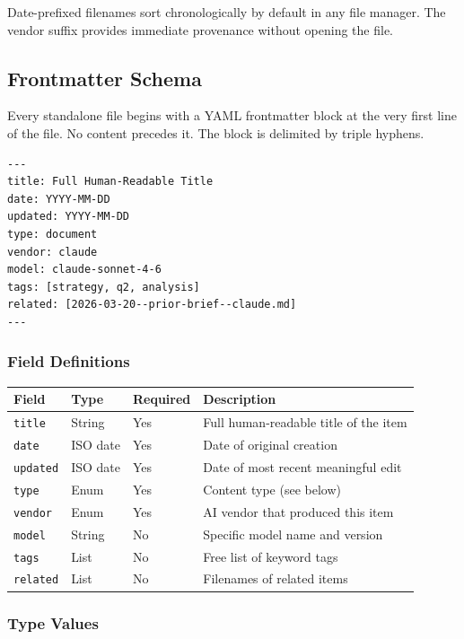 \documentclass[12pt,letterpaper]{article}
\begin{document}
Date-prefixed filenames sort chronologically by default in any file manager.
The vendor suffix provides immediate provenance without opening the file.

\subsection{Frontmatter Schema}

Every standalone file begins with a YAML frontmatter block at the very first
line of the file. No content precedes it. The block is delimited by triple
hyphens.

\begin{lstlisting}
---
title: Full Human-Readable Title
date: YYYY-MM-DD
updated: YYYY-MM-DD
type: document
vendor: claude
model: claude-sonnet-4-6
tags: [strategy, q2, analysis]
related: [2026-03-20--prior-brief--claude.md]
---
\end{lstlisting}

\subsubsection{Field Definitions}

\begin{longtable}{@{}lllp{5.5cm}@{}}
\toprule
\textbf{Field} & \textbf{Type} & \textbf{Required} & \textbf{Description} \\
\midrule
\texttt{title} & String & Yes & Full human-readable title of the item \\
\texttt{date} & ISO date & Yes & Date of original creation \\
\texttt{updated} & ISO date & Yes & Date of most recent meaningful edit \\
\texttt{type} & Enum & Yes & Content type (see below) \\
\texttt{vendor} & Enum & Yes & AI vendor that produced this item \\
\texttt{model} & String & No & Specific model name and version \\
\texttt{tags} & List & No & Free list of keyword tags \\
\texttt{related} & List & No & Filenames of related items \\
\bottomrule
\end{longtable}

\subsubsection{Type Values}
\end{document}
